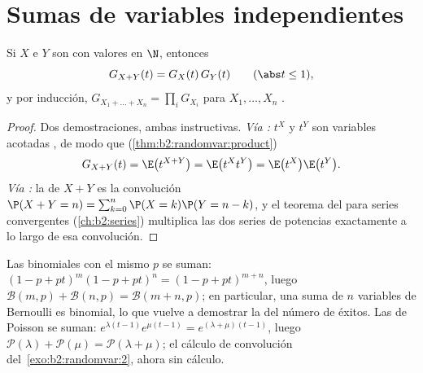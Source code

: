 \section{Sumas de variables independientes}

\begin{theorem}[Multiplicatividad]\label{thm:b2:genfun:product}
Si $X$ e $Y$ son   con valores en
$\N$, entonces
\[
G_{X + Y}(t) = G_X(t)\,G_Y(t)
\qquad (\abs t \leq 1),
\]
y por inducción, $G_{X_1 + \dots + X_n} = \prod_i G_{X_i}$ para $X_1,
\dots, X_n$ .
\end{theorem}

\begin{proof}
Dos demostraciones, ambas instructivas. \emph{Vía :} $t^X$
y $t^Y$ son variables acotadas , de modo que
(\cref{thm:b2:randomvar:product})
\[
G_{X+Y}(t) = \E\bigl(t^{X+Y}\bigr)
= \E\bigl(t^X t^Y\bigr)
= \E\bigl(t^X\bigr)\E\bigl(t^Y\bigr) .
\]
\emph{Vía :} la  de $X + Y$ es la
convolución $\P(X + Y = n) = \sum_{k=0}^n \P(X = k)\P(Y = n - k)$, y
el teorema del  para series 
convergentes (\cref{ch:b2:series}) multiplica las dos series de
potencias exactamente a lo largo de esa convolución.
\end{proof}

\begin{example}\label{ex:b2:genfun:stability}
Las binomiales  con el mismo $p$ se suman: $(1 - p +
pt)^m(1 - p + pt)^n = (1 - p + pt)^{m+n}$, luego $\mathcal{B}(m, p) +
\mathcal{B}(n, p) = \mathcal{B}(m + n, p)$; en particular, una suma
de $n$ variables de Bernoulli  es binomial, lo que vuelve
a demostrar la  del número de éxitos. Las de Poisson
 se suman: $e^{\lambda(t-1)}e^{\mu(t-1)} = e^{(\lambda +
\mu)(t-1)}$, luego $\mathcal{P}(\lambda) + \mathcal{P}(\mu) =
\mathcal{P}(\lambda + \mu)$; el cálculo de convolución del~\cref{exo:b2:randomvar:2}, ahora sin cálculo.
\end{example}

